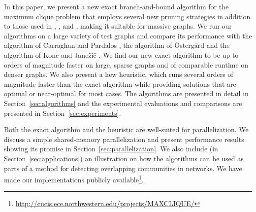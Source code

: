 In this paper, we present a new exact branch-and-bound
algorithm for the maximum clique problem that employs 
several new pruning strategies in addition to those used in \cite{pardalos},
\cite{ostergard},  \cite{citeulike:7905505} and \cite{konc2007improved},
making it suitable for massive graphs.
We run our algorithms on a large variety of test graphs and compare its performance with the
algorithm of Carraghan and Pardalos \cite{pardalos}, the algorithm of \"{O}sterg\.{a}rd \cite{ostergard} and the algorithm of Konc and Jane\v{z}i\v{c} \cite{konc2007improved}. 
We find our new exact algorithm to be up to orders of magnitude faster on large,
sparse graphs and of comparable runtime on denser graphs.
We also present a hew heuristic, which runs several orders of magnitude faster than the exact algorithm while providing solutions that are optimal or near-optimal for most cases.
The algorithms are presented in detail in Section~\ref{sec:algorithms} and the experimental evaluations and comparisons are presented in Section~\ref{sec:experiments}. 

Both the exact algorithm and the heuristic are well-suited for parallelization.
We discuss a simple shared-memory parallelization and present performance 
results showing its promise in Section~\ref{sec:parallelization}. 
We also include (in Section~\ref{sec:applications})
an illustration on how the algorithms can be used as parts of a method
for detecting overlapping communities in networks.
We have made our implementations publicly available\footnote{\url{http://cucis.ece.northwestern.edu/projects/MAXCLIQUE/}}.




